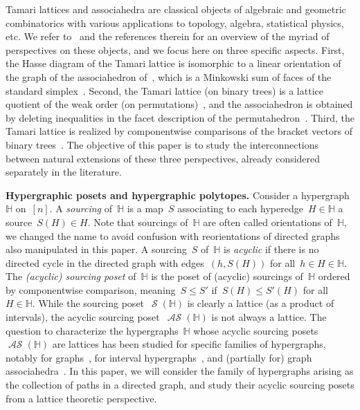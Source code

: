 \documentclass{amsart}
\theoremstyle{definition}
\newcommand{\para}[1]{\bigskip\noindent\textbf{#1}} %
\newcommand{\darkblue}{\color{darkblue}} %
\newcommand{\defn}[1]{\textsl{\darkblue #1}} %
\DeclareMathOperator{\Sour}{\mathcal{S}}  %
\DeclareMathOperator{\ASour}{\mathcal{AS}}  %
\newcommand{\HH}{\mathbb H}  %
\begin{document}
Tamari lattices and associahedra are classical objects of algebraic and geometric combinatorics with various applications to topology, algebra, statistical physics, etc.
We refer to~\cite{TamariFestschrift, CeballosSantosZiegler, PilaudSantosZiegler} and the references therein for an overview of the myriad of  perspectives on these objects, and we focus here on three specific aspects.
First, the Hasse diagram of the Tamari lattice is isomorphic to a linear orientation of the graph of the associahedron of~\cite{ShniderSternberg, Loday}, which is a Minkowski sum of faces of the standard simplex~\cite{Postnikov}.
Second, the Tamari lattice (on binary trees) is a lattice quotient of the weak order (on permutations)~\cite{Tonks, Reading-latticeCongruences}, and the associahedron is obtained by deleting inequalities in the facet description of the permutahedron~\cite{ShniderSternberg, Loday}.
Third, the Tamari lattice is realized by componentwise comparisons of the bracket vectors of binary trees~\cite{HuangTamari}.
The objective of this paper is to study the interconnections between natural extensions of these three perspectives, already considered separately in the literature.


\para{Hypergraphic posets and hypergraphic polytopes.}
Consider a hypergraph~$\HH$ on~$[n]$.
A \defn{sourcing} of~$\HH$ is a map~$S$ associating to each hyperedge~$H \in \HH$ a source~$S(H) \in H$.
Note that sourcings of~$\HH$ are often called orientations of~$\HH$, we changed the name to avoid confusion with reorientations of directed graphs also manipulated in this paper.
A sourcing~$S$ of~$\HH$ is \defn{acyclic} if there is no directed cycle in the directed graph with edges~$(h,S(H))$ for all~$h \in H \in \HH$.
The \defn{(acyclic) sourcing poset} of~$\HH$ is the poset of (acyclic) sourcings of~$\HH$ ordered by componentwise comparison, meaning~$S \le S'$ if~$S(H) \le S'(H)$ for all~$H \in \HH$.
While the sourcing poset~$\Sour(\HH)$ is clearly a lattice (as a product of intervals), the acyclic sourcing poset~$\ASour(\HH)$ is not always a lattice.
The question to characterize the hypergraphs~$\HH$ whose acyclic sourcing posets~$\ASour(\HH)$ are lattices has been studied for specific families of hypergraphs, notably for graphs~\cite{Pilaud-acyclicReorientationLattices}, for interval hypergraphs~\cite{BergeronPilaud}, and (partially for) graph associahedra~\cite{BarnardMcConville}.
In this paper, we will consider the family of hypergraphs arising as the collection of paths in a directed graph, and study their acyclic sourcing posets from a lattice theoretic perspective.
\end{document}
